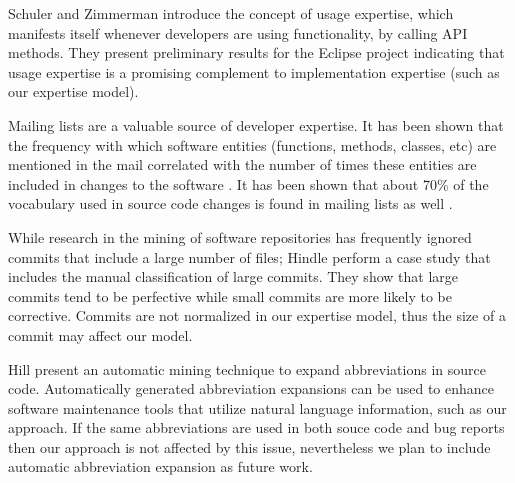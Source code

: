 Schuler and Zimmerman \cite{Schu08a} introduce the concept of usage expertise, which manifests itself whenever developers are using functionality, \eg by calling API methods. They present preliminary
results for the Eclipse project indicating that usage expertise is a promising complement to implementation expertise (such as our expertise model). 


Mailing lists are a valuable source of developer expertise. It has been shown that the frequency with which software entities (functions, methods, classes, etc) are mentioned in the mail correlated with the number of times these entities are included in changes to the software \cite{Patt08a}. It has been shown that about 70\% of the vocabulary used in source code changes is found in mailing lists as well \cite{Bays07a}.


 While research in the mining of software repositories has frequently ignored commits that include a large number of files; 
Hindle \etal \cite{Hind08b} perform a case study that includes the manual classification of large commits. They show that large commits tend to be perfective while small commits are more likely to be corrective. Commits are not normalized in our expertise model, thus the size of a commit may affect our model. 


Hill \etal \cite{Hill08a} present an automatic mining technique to expand abbreviations in source code.  Automatically generated abbreviation expansions can be used to enhance software maintenance tools that utilize natural language information, such as our approach. If the same abbreviations are used in both souce code and bug reports then our approach is not affected by this issue, nevertheless we plan to include  automatic abbreviation expansion as future work.

